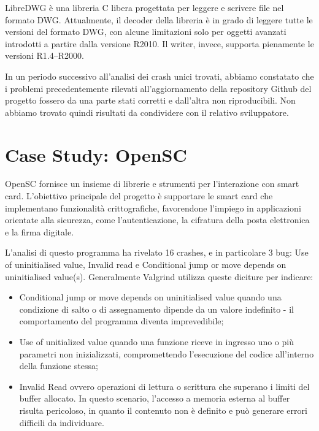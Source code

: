 LibreDWG è una libreria C libera progettata per leggere e scrivere file nel formato DWG. Attualmente, il decoder della libreria è in grado di leggere tutte le versioni del formato DWG, con alcune limitazioni solo per oggetti avanzati introdotti a partire dalla versione R2010. Il writer, invece, supporta pienamente le versioni R1.4–R2000.

In un periodo successivo all'analisi dei crash unici trovati, abbiamo constatato che i problemi precedentemente rilevati all'aggiornamento della repository Github del progetto fossero da una parte stati corretti e dall'altra non riproducibili. 
Non abbiamo trovato quindi risultati da condividere con il relativo sviluppatore. 


\section{Case Study: OpenSC}

OpenSC fornisce un insieme di librerie e strumenti per l’interazione con smart card. L’obiettivo principale del progetto è supportare le smart card che implementano funzionalità crittografiche, favorendone l’impiego in applicazioni orientate alla sicurezza, come l’autenticazione, la cifratura della posta elettronica e la firma digitale.

L'analisi di questo programma ha rivelato 16 crashes, e in particolare 3 bug: Use of uninitialised value, Invalid read e Conditional jump or move depends on uninitialised value(s). 
Generalmente Valgrind utilizza queste diciture per indicare: 
\begin{itemize}
    \item Conditional jump or move depends on uninitialised value quando una condizione di salto o di assegnamento dipende da un valore indefinito - il comportamento del programma diventa imprevedibile;
    \item Use of unitialized value quando una funzione riceve in ingresso uno o più parametri non inizializzati, compromettendo l’esecuzione del codice all’interno della funzione stessa;
    \item Invalid Read ovvero operazioni di lettura o scrittura che superano i limiti del buffer allocato. In questo scenario, l’accesso a memoria esterna al buffer risulta pericoloso, in quanto il contenuto non è definito e può generare errori difficili da individuare.
\end{itemize}
 
